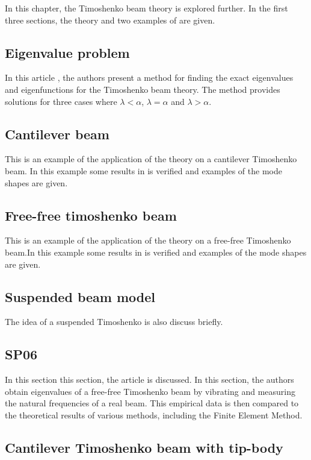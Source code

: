 \documentclass[../main.tex]{subfiles}
\begin{document}
In this chapter, the Timoshenko beam theory is explored further. In the first three sections, the theory and two examples of \cite{VV06} are given. 
\subsection{Eigenvalue problem}

In this article \cite{VV06}, the authors present a method for finding the exact eigenvalues and eigenfunctions for the Timoshenko beam theory. The method provides solutions for three cases where $\lambda <\alpha$, $\lambda =\alpha$ and $\lambda >\alpha$.\\

\subsection{Cantilever beam}
This is an example of the application of the theory on a cantilever Timoshenko beam. In this example some results in \cite{VV06} is verified and examples of the mode shapes are given.

\subsection{Free-free timoshenko beam}

This is an example of the application of the theory on a free-free Timoshenko beam.In this example some results in \cite{VV06} is verified and examples of the mode shapes are given.

\subsection{Suspended beam model}
The idea of a suspended Timoshenko is also discuss briefly.

\subsection{SP06}
In this section this section, the article \cite{SP06} is discussed. In this section, the authors obtain eigenvalues of a free-free Timoshenko beam by vibrating and measuring the natural frequencies of a real beam. This empirical data is then compared to the theoretical results of various methods, including the Finite Element Method.

\subsection{Cantilever Timoshenko beam with tip-body}
\end{document}
